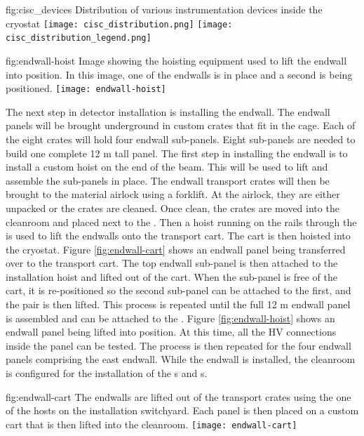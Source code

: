 \begin{dunefigure}{fig:cisc_devices}
  {Distribution of various instrumentation devices inside the cryostat}
  \texttt{[image: cisc\_distribution.png]}
  \texttt{[image: cisc\_distribution\_legend.png]}
\end{dunefigure}

\begin{dunefigure}{fig:endwall-hoist}
  {Image showing the hoisting equipment used to lift the endwall into position. In this image, one of the endwalls is in place and a second is being positioned.}
\texttt{[image: endwall-hoist]}
\end{dunefigure}

The next step in detector installation is installing the  endwall. 
The endwall panels will be brought underground in custom crates that fit in the cage. 
Each of the eight crates will hold four endwall sub-panels. Eight sub-panels are needed to build one complete 12 \si{m} tall panel.  
The first step in installing the endwall is to install a custom hoist on the end of the  beam. 
This will be used to lift and assemble the sub-panels in place. 
The endwall transport crates will then be brought to the material airlock using a forklift. At the airlock, they are either unpacked or the crates are cleaned. 
Once clean, the crates are moved into the cleanroom and placed next to the . Then a hoist running on the rails through the  is used to lift the endwalls onto the transport cart. The cart is then hoisted into the cryostat. 
Figure \ref{fig:endwall-cart} shows an endwall panel being transferred over to the transport cart.
The top endwall sub-panel is then attached to the installation hoist and lifted out of the cart. When the sub-panel is free of  the cart, it is re-positioned so the second sub-panel can be attached to the first, and the pair is then lifted. This process is repeated until the full 12 \si{m} endwall  panel is assembled and can be attached to the . 
Figure \ref{fig:endwall-hoist} shows an endwall panel being lifted into position.
At this time, all the HV connections inside the panel can be tested. The process is then repeated for the four endwall panels comprising the east endwall. 
While the endwall is installed, the cleanroom is configured for the installation of the s and s. 

\begin{dunefigure}{fig:endwall-cart}
  {The endwalls are lifted out of the transport crates using the one of the hosts on the installation switchyard. Each panel is then placed on a custom cart that is then lifted into the cleanroom.}
\texttt{[image: endwall-cart]}
\end{dunefigure}


